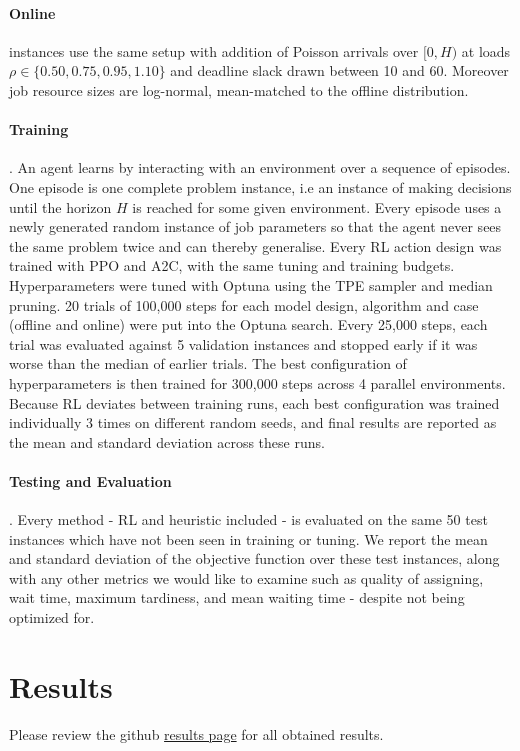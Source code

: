 \documentclass[12pt]{article}
\begin{document}
\paragraph{Online} instances use the same setup with addition of Poisson arrivals over $[0, H)$ at loads $\rho\in\{0.50, 0.75, 0.95, 1.10\}$ and deadline slack drawn between 10 and 60. Moreover job resource sizes are log-normal, mean-matched to the offline distribution.

\paragraph{Training}. An agent learns by interacting with an environment over a sequence of episodes. One episode is one complete problem instance, i.e an instance of making decisions until the horizon $H$ is reached for some given environment. Every episode uses a newly generated random instance of job parameters so that the agent never sees the same problem twice and can thereby generalise. Every RL action design was trained with PPO and A2C, with the same tuning and training budgets. Hyperparameters were tuned with Optuna \cite{akiba2019optuna} using the TPE sampler \cite{bergstra2011tpe} and median pruning. 20 trials of 100,000 steps for each model design, algorithm and case (offline and online) were put into the Optuna search. Every 25,000 steps, each trial was evaluated against 5 validation instances and stopped early if it was worse than the median of earlier trials. The best configuration of hyperparameters is then trained for 300,000 steps across 4 parallel environments. Because RL deviates between training runs, each best configuration was trained individually 3 times on different random seeds, and final results are reported as the mean and standard deviation across these runs.



\paragraph{Testing and Evaluation}. Every method - RL and heuristic included - is evaluated on the same 50 test instances which have not been seen in training or tuning. We report the mean and standard deviation of the objective function over these test instances, along with any other metrics we would like to examine such as quality of assigning, wait time, maximum tardiness, and mean waiting time - despite not being optimized for.

\section{Results}
Please review the github \href{https://github.com/Ethan-Ty-Riekert/Neural-Knapsack-Research-Project/tree/main/Results}{results page} for all obtained results.
\end{document}
